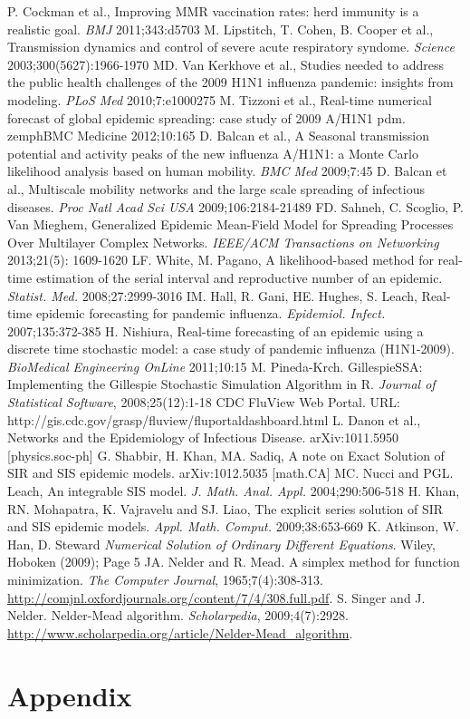 \documentclass[11pt, a4paper, oneside,titlepage]{article}
\begin{document}
\begin{thebibliography}{1}
	P. Cockman et al., Improving MMR vaccination rates: herd immunity is a realistic goal. \emph{BMJ} 2011;343:d5703
	M. Lipstitch, T. Cohen, B. Cooper et al., Transmission dynamics and control of severe acute respiratory syndome. \emph{Science} 2003;300(5627):1966-1970
	MD. Van Kerkhove et al., Studies needed to address the public health challenges of the 2009 H1N1 influenza pandemic: insights from modeling. \emph{PLoS Med} 2010;7:e1000275
	M. Tizzoni et al., Real-time numerical forecast of global epidemic spreading: case study of 2009 A/H1N1 pdm. zemph{BMC Medicine} 2012;10:165
	D. Balcan et al., A Seasonal transmission potential and activity peaks of the new influenza A/H1N1: a Monte Carlo likelihood analysis based on human mobility. \emph{BMC Med} 2009;7:45
	D. Balcan et al., Multiscale mobility networks and the large scale spreading of infectious diseases. \emph{Proc Natl Acad Sci USA} 2009;106:2184-21489
	FD. Sahneh, C. Scoglio, P. Van Mieghem, Generalized Epidemic Mean-Field Model for Spreading Processes Over Multilayer Complex Networks. \emph{IEEE/ACM Transactions on Networking} 2013;21(5): 1609-1620
LF. White, M. Pagano, A likelihood-based method for real-time estimation of the serial interval and reproductive number of an epidemic. \emph{Statist. Med.} 2008;27:2999-3016
IM. Hall, R. Gani, HE. Hughes, S. Leach, Real-time epidemic forecasting for pandemic influenza. \emph{Epidemiol. Infect.} 2007;135:372-385
H. Nishiura, Real-time forecasting of an epidemic using a discrete time stochastic model: a case study of pandemic influenza (H1N1-2009). \emph{BioMedical Engineering OnLine} 2011;10:15
	M. Pineda-Krch. GillespieSSA: Implementing the Gillespie Stochastic Simulation Algorithm in R. \emph{Journal of Statistical Software}, 2008;25(12):1-18
	CDC FluView Web Portal. URL: http://gis.cdc.gov/grasp/fluview/fluportaldashboard.html
	L. Danon et al., Networks and the Epidemiology of Infectious
        Disease. arXiv:1011.5950 [physics.soc-ph]
        G. Shabbir, H. Khan, MA. Sadiq, A note on Exact Solution of SIR and
        SIS epidemic models. arXiv:1012.5035 [math.CA]
        MC. Nucci and PGL. Leach, An integrable SIS model. \emph{J. Math. Anal. Appl.} 2004;290:506-518
        H. Khan, RN. Mohapatra, K. Vajravelu and SJ. Liao, The explicit
        series solution of SIR and SIS epidemic
        models. \emph{Appl. Math. Comput.} 2009;38:653-669
        K. Atkinson, W. Han, D. Steward \emph{Numerical Solution of
          Ordinary Different Equations}. Wiley, Hoboken (2009); Page 5
  JA. Nelder and R. Mead. A simplex method for function
  minimization. \emph{The Computer Journal},
  1965;7(4):308-313. \url{http://comjnl.oxfordjournals.org/content/7/4/308.full.pdf}.
  S. Singer and J. Nelder. Nelder-Mead algorithm. \emph{Scholarpedia},
  2009;4(7):2928.
  \url{http://www.scholarpedia.org/article/Nelder-Mead_algorithm}. 

\end{thebibliography}

\section*{Appendix}
\end{document}
